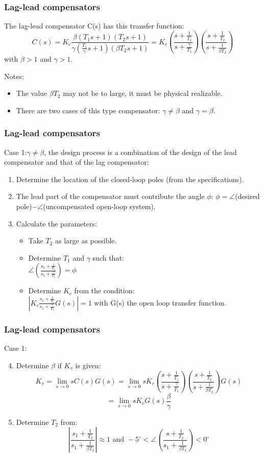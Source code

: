 \begin{frame}
	\frametitle{Lag-lead compensators}
	The lag-lead compensator C(s) has this transfer function: 
	$$C(s)=K_c\frac{\beta (T_1s+1)(T_2s+1)}{\gamma (\frac{T_1}{\gamma}s+1)(\beta T_2s+1)}=K_c(\frac{s+\frac{1}{T_1}}{s+\frac{\gamma}{T_1}})
	(\frac{s+\frac{1}{T_2}}{s+\frac{1}{\beta T_2}})$$ with $\beta>1$ and $\gamma>1$.\vspace{4mm}
	
	Notes:
	\begin{itemize}
		\item The value $\beta T_2$ may not be to large, it must be physical realizable.
		\item  There are two cases of this type compensator: $\gamma\neq \beta$ and $\gamma= \beta$.
	\end{itemize}
\end{frame}

\begin{frame}
	\frametitle{Lag-lead compensators}
	Case 1:$\gamma\neq \beta$,  the design process is a combination of the design of the lead compensator and that of the lag compensator:
	\begin{enumerate}
		\item Determine the location of the closed-loop poles (from the specifications).
		\item The lead part of the compensator must contribute the angle $\phi$: $\phi=\angle$(desired pole)$-\angle$(uncompensated open-loop system).
		\item Calculate the parameters:
		\begin{itemize}
			\item Take $T_2$ as large as possible.
			\item Determine $T_1$ and $\gamma$ such that:\\ 
			$\angle(\frac{s_1+\frac{1}{T_1}}{s_1+\frac{\gamma}{T_1}})=\phi$
			\item Determine $K_c$ from the condition:\\
			$|K_c\frac{s_1+\frac{1}{T_1}}{s_1+\frac{\gamma}{T_1}}G(s)|=1$ with G(s) the open loop transfer function.
		\end{itemize}
	\end{enumerate}
\end{frame}

\begin{frame}
	\frametitle{Lag-lead compensators}
	Case 1:
	\begin{enumerate}
		\setcounter{enumi}{3}
		\item Determine $\beta$ if $K_v$ is given:
		$$K_v=\lim_{s\to0}sC(s)G(s)=\lim_{s\to 0}sK_c(\frac{s+\frac{1}{T_1}}{s+\frac{\gamma}{T_1}})
		(\frac{s+\frac{1}{T_2}}{s+\frac{1}{\beta T_2}})G(s)$$
		$$=\lim_{s\to0}sK_cG(s)\frac{\beta}{\gamma}$$
		\item Determine $T_2$ from:\\
		$$|\frac{s_1+\frac{1}{T_2}}{s_1+\frac{1}{\beta T_2}}|\approx 1 \text{ and } -5^{\circ}<\angle(\frac{s+\frac{1}{T_2}}{s_1+\frac{1}{\beta T_2}})<0^{\circ}$$
	\end{enumerate}
\end{frame}

